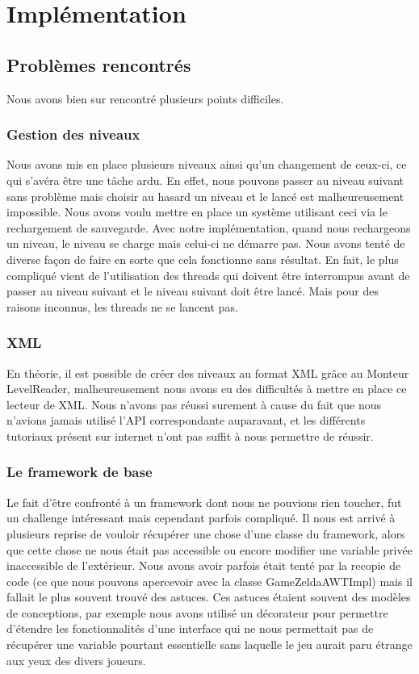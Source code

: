 \documentclass[a4paper,11pt]{article}
\begin{document}
\section{Implémentation}

\subsection*{Problèmes rencontrés}

Nous avons bien sur rencontré plusieurs points difficiles.

\subsubsection*{Gestion des niveaux}

Nous avons mis en place plusieurs niveaux ainsi qu'un changement de ceux-ci, 
ce qui s'avéra \^etre une t\^ache ardu. En effet, nous pouvons passer au niveau 
suivant sans problème mais choisir au hasard un niveau et le lancé est malheureusement
impossible. Nous avons voulu mettre en place un système utilisant ceci via le rechargement
de sauvegarde. Avec notre implémentation, quand nous rechargeons un niveau, le niveau se 
charge mais celui-ci ne démarre pas. Nous avons tenté de diverse façon de faire en sorte que
cela fonctionne sans résultat. En fait, le plus compliqué vient de l'utilisation des threads
qui doivent être interrompus avant de passer au niveau suivant et le niveau suivant doit être
lancé. Mais pour des raisons inconnus, les threads ne se lancent pas.

\subsubsection*{XML}

En théorie, il est possible de créer des niveaux au format XML grâce au Monteur LevelReader, malheureusement
nous avons eu des difficultés à mettre en place ce lecteur de XML. Nous n'avons pas réussi surement 
à cause du fait que nous n'avions jamais utilisé l'API correspondante auparavant, et les différents 
tutoriaux présent sur internet n'ont pas suffit à nous permettre de réussir.

\subsubsection*{Le framework de base}

Le fait d'être confronté à un framework dont nous ne pouvions rien toucher, fut un challenge intéressant 
mais cependant parfois compliqué. Il nous est arrivé à plusieurs reprise de vouloir récupérer une chose
d'une classe du framework, alors que cette chose ne nous était pas accessible ou encore modifier une variable
privée inaccessible de l'extérieur. Nous avons avoir parfois était tenté par la recopie de code (ce que nous 
pouvons apercevoir avec la classe GameZeldaAWTImpl) mais il fallait le plus souvent trouvé des astuces. Ces astuces 
étaient souvent des modèles de conceptions, par exemple nous avons utilisé un décorateur pour permettre d'étendre 
les fonctionnalités d'une interface qui ne nous permettait pas de récupérer une variable pourtant essentielle 
sans laquelle le jeu aurait paru étrange aux yeux des divers joueurs.
\end{document}
